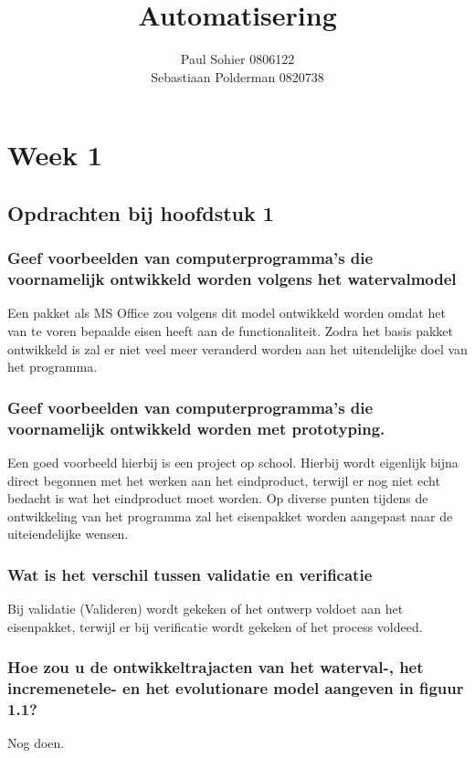 \documentclass[a4paper,titlepage]{artikel1}
\author{Paul Sohier 0806122\\Sebastiaan Polderman 0820738}
\title{Automatisering}
\begin{document}
\maketitle
\tableofcontents
\newpage
 \section{Week 1}
  \subsection{Opdrachten bij hoofdstuk 1}
   \subsubsection[Opdracht 1]{Geef voorbeelden van computerprogramma's die voornamelijk ontwikkeld worden volgens het watervalmodel}
   Een pakket als MS Office zou volgens dit model ontwikkeld worden omdat het van te voren bepaalde eisen heeft aan de functionaliteit. 
   Zodra het basis pakket ontwikkeld is zal er niet veel meer veranderd worden aan het uitendelijke doel van het programma.
   
   \subsubsection[Opdracht 2]{Geef voorbeelden van computerprogramma's die voornamelijk ontwikkeld worden met prototyping.}
   Een goed voorbeeld hierbij is een project op school. Hierbij wordt eigenlijk bijna direct begonnen met het werken aan het eindproduct, terwijl er nog niet echt bedacht is wat het eindproduct moet worden. Op diverse punten tijdens de ontwikkeling van het programma zal het eisenpakket worden aangepast naar de uiteiendelijke wensen.
   
   \subsubsection[Opdracht 3]{Wat is het verschil tussen validatie en verificatie}
   Bij validatie (Valideren) wordt gekeken of het ontwerp voldoet aan het eisenpakket, terwijl er bij verificatie wordt gekeken of het process voldeed.
   
   \subsubsection[Opdracht 4]{Hoe zou u de ontwikkeltrajacten van het waterval-, het incremenetele- en het evolutionare model aangeven in figuur 1.1?}
   Nog doen.
   
\end{document}
